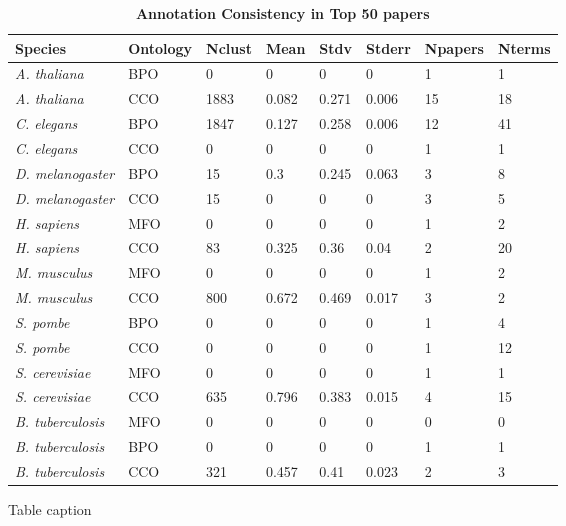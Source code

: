 \documentclass[12pt]{article}
\begin{document}
\begin{table}[!ht]
\caption{
\bf{Annotation Consistency in Top 50 papers}}
\begin{tabular}{|p{3cm}|l|l|l|l|l|l|l|}
\hline
Species & Ontology & Nclust & Mean & Stdv & Stderr & Npapers & Nterms \\ \hline
\textit{A. thaliana} & BPO & 0 & 0 & 0 & 0 & 1 & 1 \\ \hline
\textit{A. thaliana} & CCO & 1883 & 0.082 & 0.271 & 0.006 & 15 & 18 \\ \hline
\textit{C. elegans} & BPO & 1847 & 0.127 & 0.258 & 0.006 & 12 & 41 \\ \hline
\textit{C. elegans} & CCO & 0 & 0 & 0 & 0 & 1 & 1 \\ \hline
\textit{D. melanogaster} & BPO & 15 & 0.3 & 0.245 & 0.063 & 3 & 8 \\ \hline
\textit{D. melanogaster} & CCO & 15 & 0 & 0 & 0 & 3 & 5 \\ \hline
\textit{H. sapiens} & MFO & 0 & 0 & 0 & 0 & 1 & 2 \\ \hline
\textit{H. sapiens} & CCO & 83 & 0.325 & 0.36 & 0.04 & 2 & 20 \\ \hline
\textit{M. musculus} & MFO & 0 & 0 & 0 & 0 & 1 & 2 \\ \hline
\textit{M. musculus} & CCO & 800 & 0.672 & 0.469 & 0.017 & 3 & 2 \\ \hline
\textit{S. pombe} & BPO & 0 & 0 & 0 & 0 & 1 & 4 \\ \hline
\textit{S. pombe} & CCO & 0 & 0 & 0 & 0 & 1 & 12 \\ \hline
\textit{S. cerevisiae} & MFO & 0 & 0 & 0 & 0 & 1 & 1\\ \hline
\textit{S. cerevisiae} & CCO & 635 & 0.796 & 0.383 & 0.015 & 4 & 15\\ \hline
\textit{B. tuberculosis} & MFO & 0 & 0 & 0 & 0 & 0 & 0\\ \hline
\textit{B. tuberculosis} & BPO & 0 & 0 & 0 & 0 & 1 & 1\\ \hline
\textit{B. tuberculosis} & CCO & 321 & 0.457 & 0.41 & 0.023 & 2 & 3\\ \hline
\end{tabular}
\begin{flushleft}Table caption
\end{flushleft}
\label{tab:dreamcatcher2}
\end{table}
\end{document}
